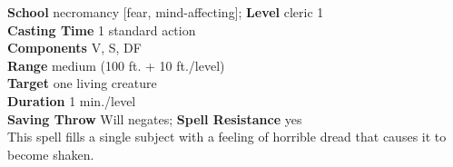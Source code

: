 \textbf{School} necromancy [fear, mind-affecting]; \textbf{Level} cleric 1\\
\textbf{Casting Time} 1 standard action\\
\textbf{Components} V, S, DF\\
\textbf{Range }medium (100 ft. + 10 ft./level)\\
\textbf{Target} one living creature\\
\textbf{Duration} 1 min./level\\
\textbf{Saving Throw }Will negates; \textbf{Spell Resistance} yes\\
This spell fills a single subject with a feeling of horrible dread that causes it to become shaken.\\
